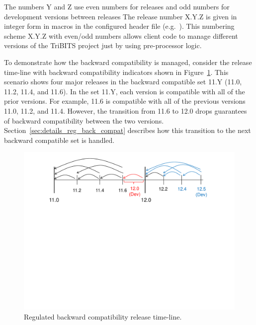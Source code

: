 \documentclass[11pt]{SANDreport}
\begin{document}
The numbers Y and Z use even numbers for releases and odd numbers for
development versions between releases
The release number X.Y.Z is given in integer form in macros in the
configured header file {} (e.g.\
{}).  This numbering scheme X.Y.Z with
even/odd numbers allows client code to manage different versions of
the TriBITS project just by using pre-processor logic.

To demonstrate how the backward compatibility is managed, consider the
release time-line with backward compatibility indicators shown in
Figure~\ref{fig:BackwardCompatibilityTimeline}.  This scenario shows
four major releases in the backward compatible set 11.Y (11.0, 11.2,
11.4, and 11.6).  In the set 11.Y, each version is compatible with all
of the prior versions.  For example, 11.6 is compatible with all of
the previous versions 11.0, 11.2, and 11.4.  However, the transition
from 11.6 to 12.0 drops guarantees of backward compatibility between
the two versions.  Section~\ref{sec:details_reg_back_compat} describes
how this transition to the next backward compatible set is handled.

\begin{figure}
\begin{center}
\includegraphics[trim = 1.0in 5.0in 1.0in 0.2in, scale=0.55]
{BackwardCompatibilityTimeline}
{}\caption{Regulated backward compatibility release time-line.}
\label{fig:BackwardCompatibilityTimeline}
\end{center}
\end{figure}
\end{document}
